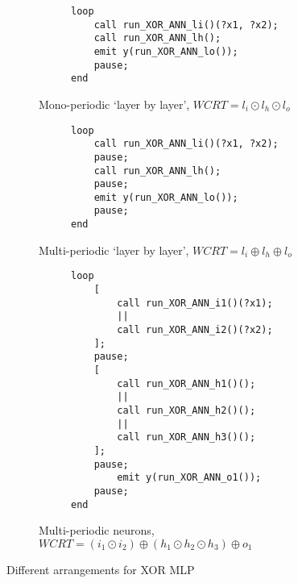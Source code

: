 \begin{figure}
\begin{subfigure}[]{0.5\textwidth}
	\begin{subfigure}[]{0.3\textwidth}
		\centering
		
	\end{subfigure}%
	\begin{subfigure}[]{0.66\textwidth}
		\vspace{3mm}
		\begin{lstlisting}
loop
	call run_XOR_ANN_li()(?x1, ?x2);
	call run_XOR_ANN_lh();
	emit y(run_XOR_ANN_lo());
	pause;
end
		\end{lstlisting}
	\end{subfigure}
	\caption{Mono-periodic `layer by layer', $WCRT = l_i \odot l_h \odot l_o$}
	\label{fig:tca-bb}
\end{subfigure}

\vspace{5mm}
\begin{subfigure}[]{0.5\textwidth}
	\begin{subfigure}[]{0.3\textwidth}
		\centering
		
	\end{subfigure}%
	\begin{subfigure}[]{0.66\textwidth}
	\begin{lstlisting}
loop
	call run_XOR_ANN_li()(?x1, ?x2);
	pause;
	call run_XOR_ANN_lh();
	pause;
	emit y(run_XOR_ANN_lo());
	pause;
end
	\end{lstlisting}
	\end{subfigure}
	\caption{Multi-periodic `layer by layer', $WCRT = l_i \oplus l_h \oplus l_o$}
	\label{fig:tca-layers}
\end{subfigure}

\vspace{5mm}
\begin{subfigure}[]{0.5\textwidth}
	\begin{subfigure}[]{0.3\textwidth}
		\centering
		
	\end{subfigure}%
	\begin{subfigure}[]{0.66\textwidth}
		\begin{lstlisting}
loop
	[
		call run_XOR_ANN_i1()(?x1);
		|| 
		call run_XOR_ANN_i2()(?x2);
	];
	pause;
	[
		call run_XOR_ANN_h1()();
		||
		call run_XOR_ANN_h2()();
		||
		call run_XOR_ANN_h3()();
	];
	pause;
		emit y(run_XOR_ANN_o1());
	pause;
end
		\end{lstlisting}
	\end{subfigure}
	\caption{Multi-periodic neurons, $WCRT = \left(i_1 \odot i_2\right) \oplus \left(h_1 \odot h_2 \odot h_3\right) \oplus o_1$}
	\label{fig:tca-neurons}
\end{subfigure}
\caption{Different arrangements for XOR \ac{MLP}}
\label{fig:tcas-xor}
\end{figure}